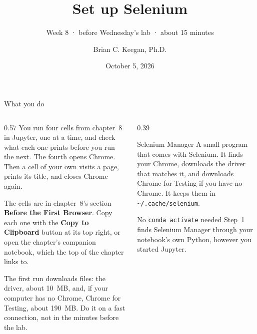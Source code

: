 \documentclass{handout}
\title[INFO 4617 · Week 8 · Set up Selenium]{Set up Selenium}
\subtitle{Week 8 · before Wednesday's lab · about 15 minutes}
\author{Brian C. Keegan, Ph.D.}
\institute{Department of Information Science, University of Colorado Boulder}
\date{October 5, 2026}
\begin{document}
\maketitle

\begin{frame}{What you do}
  \begin{columns}[T]
    \begin{column}{0.57\textwidth}
      You run four cells from chapter~8 in Jupyter, one at a time, and check
      what each one prints before you run the next. The fourth opens Chrome.
      Then a cell of your own visits a page, prints its title, and closes
      Chrome again.

      \smallskip
      The cells are in chapter~8's section \textbf{Before the First Browser}.
      Copy each one with the \textbf{Copy to Clipboard} button at its top
      right, or open the chapter's companion notebook, which the top of the
      chapter links to.

      \smallskip
      The first run downloads files: the driver, about 10~MB, and, if your
      computer has no Chrome, Chrome for Testing, about 190~MB. Do it on a
      fast connection, not in the minutes before the lab.
    \end{column}
    \begin{column}{0.39\textwidth}
      \begin{block}{Selenium Manager}
        \small A small program that comes with Selenium. It finds your
        Chrome, downloads the driver that matches it, and downloads Chrome
        for Testing if you have no Chrome. It keeps them in
        \texttt{\textasciitilde/.cache/selenium}.
      \end{block}
      \begin{alertblock}{No \texttt{conda activate} needed}
        \small Step~1 finds Selenium Manager through your notebook's own
        Python, however you started Jupyter.
      \end{alertblock}
    \end{column}
  \end{columns}
\end{frame}
\end{document}
